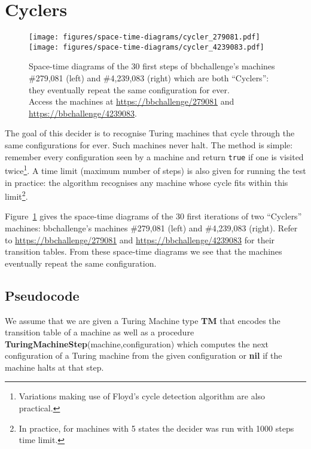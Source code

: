 
\section{Cyclers}\label{sec:cyclers}

\begin{figure}[h!]
  \centering
  \texttt{[image: figures/space-time-diagrams/cycler\_279081.pdf]}
  \hspace{2ex}
  \texttt{[image: figures/space-time-diagrams/cycler\_4239083.pdf]}
  \caption{Space-time diagrams of the 30 first steps of bbchallenge's machines \#279,081 (left) and \#4,239,083 (right) which are both ``Cyclers'': they eventually repeat the same configuration for ever. \\
    Access the machines at \url{https://bbchallenge/279081} and
    \url{https://bbchallenge/4239083}.}\label{fig:cyclers}
\end{figure}

The goal of this decider is to recognise Turing machines that cycle through the same configurations for ever. Such machines never halt. The method is simple: remember every configuration seen by a machine and return \texttt{true} if one is visited twice\footnote{Variations making use of Floyd's cycle detection algorithm are also practical.}. A time limit (maximum number of steps) is also given for running the test in practice: the algorithm recognises any machine whose cycle fits within this limit\footnote{In practice, for machines with 5 states the decider was run with 1000 steps time limit.}.


\begin{example}\normalfont
  Figure~\ref{fig:cyclers} gives the space-time diagrams of the 30 first iterations of two ``Cyclers'' machines: bbchallenge's machines \#279,081 (left) and \#4,239,083 (right). Refer to \url{https://bbchallenge/279081} and
  \url{https://bbchallenge/4239083} for their transition tables. From these space-time diagrams we see that the machines eventually repeat the same configuration.
\end{example}

\newpage
\subsection{Pseudocode}

We assume that we are given a Turing Machine type \textbf{TM} that encodes the transition table of a machine as well as a procedure \textbf{TuringMachineStep}(machine,configuration) which computes the next configuration of a Turing machine from the given configuration or \textbf{nil} if the machine halts at that step.

